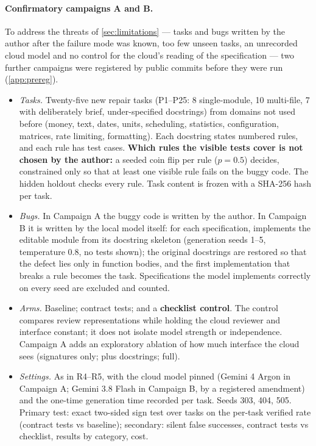 \documentclass[11pt]{article}
\begin{document}
\paragraph{Confirmatory campaigns A and B.} To address the threats of \cref{sec:limitations} --- tasks and bugs written by the author after the failure mode was known, too few unseen tasks, an unrecorded cloud model and no control for the cloud's reading of the specification --- two further campaigns were registered by public commits before they were run (\cref{app:prereg}).
\begin{itemize}
\item \emph{Tasks.} Twenty-five new repair tasks (P1--P25: 8 single-module, 10 multi-file, 7 with deliberately brief, under-specified docstrings) from domains not used before (money, text, dates, units, scheduling, statistics, configuration, matrices, rate limiting, formatting). Each docstring states numbered rules, and each rule has test cases. \textbf{Which rules the visible tests cover is not chosen by the author:} a seeded coin flip per rule ($p=0.5$) decides, constrained only so that at least one visible rule fails on the buggy code. The hidden holdout checks every rule. Task content is frozen with a SHA-256 hash per task.
\item \emph{Bugs.} In Campaign A the buggy code is written by the author. In Campaign B it is written by the local model itself: for each specification,  implements the editable module from its docstring skeleton (generation seeds 1--5, temperature 0.8, no tests shown); the original docstrings are restored so that the defect lies only in function bodies, and the first implementation that breaks a rule becomes the task. Specifications the model implements correctly on every seed are excluded and counted.
\item \emph{Arms.} Baseline; contract tests; and a \textbf{checklist control}. The control compares review representations while holding the cloud reviewer and interface constant; it does not isolate model strength or independence. Campaign A adds an exploratory ablation of how much interface the cloud sees (signatures only; plus docstrings; full).
\item \emph{Settings.} As in R4--R5, with the cloud model pinned (Gemini 4 Argon in Campaign A; Gemini 3.8 Flash in Campaign B, by a registered amendment) and the one-time generation time recorded per task. Seeds 303, 404, 505. Primary test: exact two-sided sign test over tasks on the per-task verified rate (contract tests vs baseline); secondary: silent false successes, contract tests vs checklist, results by category, cost.
\end{itemize}
\end{document}
